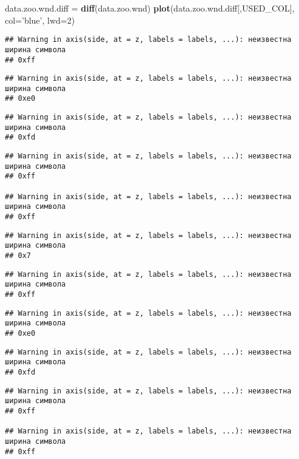 \documentclass[
]{article}
\newenvironment{Shaded}{\begin{snugshade}}{\end{snugshade}}
\newcommand{\DataTypeTok}[1]{\textcolor[rgb]{0.13,0.29,0.53}{#1}}
\newcommand{\DecValTok}[1]{\textcolor[rgb]{0.00,0.00,0.81}{#1}}
\newcommand{\KeywordTok}[1]{\textcolor[rgb]{0.13,0.29,0.53}{\textbf{#1}}}
\newcommand{\NormalTok}[1]{#1}
\newcommand{\StringTok}[1]{\textcolor[rgb]{0.31,0.60,0.02}{#1}}
\begin{document}
\begin{Shaded}
\begin{Highlighting}[]
\NormalTok{data.zoo.wnd.diff =}\StringTok{ }\KeywordTok{diff}\NormalTok{(data.zoo.wnd)}
\KeywordTok{plot}\NormalTok{(data.zoo.wnd.diff[,USED_COL], }\DataTypeTok{col=}\StringTok{'blue'}\NormalTok{, }\DataTypeTok{lwd=}\DecValTok{2}\NormalTok{)}
\end{Highlighting}
\end{Shaded}

\begin{verbatim}
## Warning in axis(side, at = z, labels = labels, ...): неизвестна ширина символа
## 0xff
\end{verbatim}

\begin{verbatim}
## Warning in axis(side, at = z, labels = labels, ...): неизвестна ширина символа
## 0xe0
\end{verbatim}

\begin{verbatim}
## Warning in axis(side, at = z, labels = labels, ...): неизвестна ширина символа
## 0xfd
\end{verbatim}

\begin{verbatim}
## Warning in axis(side, at = z, labels = labels, ...): неизвестна ширина символа
## 0xff

## Warning in axis(side, at = z, labels = labels, ...): неизвестна ширина символа
## 0xff
\end{verbatim}

\begin{verbatim}
## Warning in axis(side, at = z, labels = labels, ...): неизвестна ширина символа
## 0x7
\end{verbatim}

\begin{verbatim}
## Warning in axis(side, at = z, labels = labels, ...): неизвестна ширина символа
## 0xff
\end{verbatim}

\begin{verbatim}
## Warning in axis(side, at = z, labels = labels, ...): неизвестна ширина символа
## 0xe0
\end{verbatim}

\begin{verbatim}
## Warning in axis(side, at = z, labels = labels, ...): неизвестна ширина символа
## 0xfd
\end{verbatim}

\begin{verbatim}
## Warning in axis(side, at = z, labels = labels, ...): неизвестна ширина символа
## 0xff

## Warning in axis(side, at = z, labels = labels, ...): неизвестна ширина символа
## 0xff
\end{verbatim}
\end{document}
